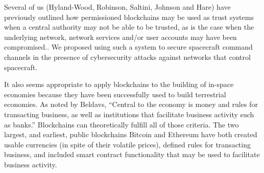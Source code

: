 \documentclass[journal ]{new-aiaa}
\begin{document}
Several of us (Hyland-Wood, Robinson, Saltini, Johnson and Hare) have previously outlined how permissioned blockchains may be used as trust systems when a central authority may not be able to be trusted, as is the case when the underlying network, network services and/or user accounts may have been compromised.\cite{hyland-wood-icssc2019}. We proposed using such a system to secure spacecraft command channels in the presence of cybersecurity attacks against networks that control spacecraft.

It also seems appropriate to apply blockchains to the building of in-space economies because they have been successfully used to build terrestrial economies. As noted by Beldavs\cite{beldavs_blockchains_2016}, ``Central to the economy is money and rules for transacting business, as well as institutions that facilitate business activity such as banks.'' Blockchains can theoretically fulfill all of those criteria. The two largest, and earliest, public blockchains Bitcoin\cite{nakamoto_bitcoin_2008} and Ethereum\cite{buterin_ethereum_2013,wood_ethereum_2014} have both created usable currencies (in spite of their volatile prices), defined rules for transacting business, and included smart contract functionality\cite{szabo_smart_1994} that may be used to facilitate business activity.
\end{document}
